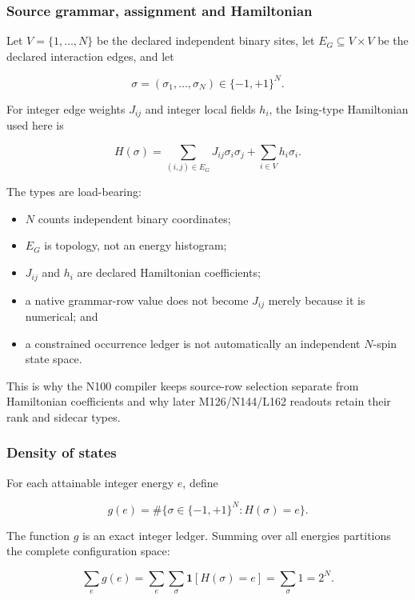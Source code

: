 \subsubsection{Source grammar, assignment and
Hamiltonian}\label{viii-ch03-source-grammar-assignment-and-hamiltonian}

Let \(V=\{1,\ldots,N\}\) be the declared independent binary sites, let
\(E_G\subseteq V\times V\) be the declared interaction edges, and let

\[
\sigma=(\sigma_1,\ldots,\sigma_N)\in\{-1,+1\}^N.
\]

For integer edge weights \(J_{ij}\) and integer local fields \(h_i\),
the Ising-type Hamiltonian used here is

\[
H(\sigma)=\sum_{(i,j)\in E_G}J_{ij}\sigma_i\sigma_j
          +\sum_{i\in V}h_i\sigma_i.
\]

The types are load-bearing:

\begin{itemize}
\tightlist
\item
  \(N\) counts independent binary coordinates;
\item
  \(E_G\) is topology, not an energy histogram;
\item
  \(J_{ij}\) and \(h_i\) are declared Hamiltonian coefficients;
\item
  a native grammar-row value does not become \(J_{ij}\) merely because
  it is numerical; and
\item
  a constrained occurrence ledger is not automatically an independent
  \(N\)-spin state space.
\end{itemize}

This is why the N100 compiler keeps source-row selection separate from
Hamiltonian coefficients and why later M126/N144/L162 readouts retain
their rank and sidecar types.

\subsubsection{Density of states}\label{viii-ch03-density-of-states}

For each attainable integer energy \(e\), define

\[
g(e)=\#\{\sigma\in\{-1,+1\}^N:H(\sigma)=e\}.
\]

The function \(g\) is an exact integer ledger. Summing over all energies
partitions the complete configuration space:

\[
\sum_e g(e)
=\sum_e\sum_{\sigma}\mathbf 1[H(\sigma)=e]
=\sum_{\sigma}1
=2^N.
\]

